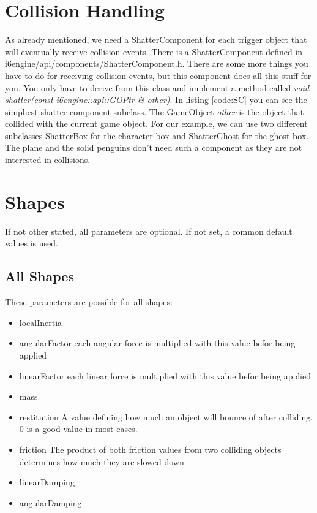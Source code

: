 \documentclass{article}
\begin{document}
\section{Collision Handling}

As already mentioned, we need a ShatterComponent for each trigger object that will eventually receive collision events. There is a ShatterComponent defined in i6engine/api/components/ShatterComponent.h. There are some more things you have to do for receiving collision events, but this component does all this stuff for you. You only have to derive from this class and implement a method called \textit{void shatter(const i6engine::api::GOPtr \& other)}. In listing \ref{code:SC} you can see the simpliest shatter component subclass. The GameObject \textit{other} is the object that collided with the current game object. For our example, we can use two different subclasses ShatterBox for the character box and ShatterGhost for the ghost box. The plane and the solid penguins don't need such a component as they are not interested in collisions.


\section{Shapes}\label{note:shapes}

If not other stated, all parameters are optional. If not set, a common default values is used.

\subsection{All Shapes}

These parameters are possible for all shapes:
\begin{itemize}
	\item localInertia
	\item angularFactor each angular force is multiplied with this value befor being applied
	\item linearFactor each linear force is multiplied with this value befor being applied
	\item mass
	\item restitution A value defining how much an object will bounce of after colliding. 0 is a good value in most cases.
	\item friction The product of both friction values from two colliding objects determines how much they are slowed down
	\item linearDamping
	\item angularDamping
\end{itemize}
\end{document}

